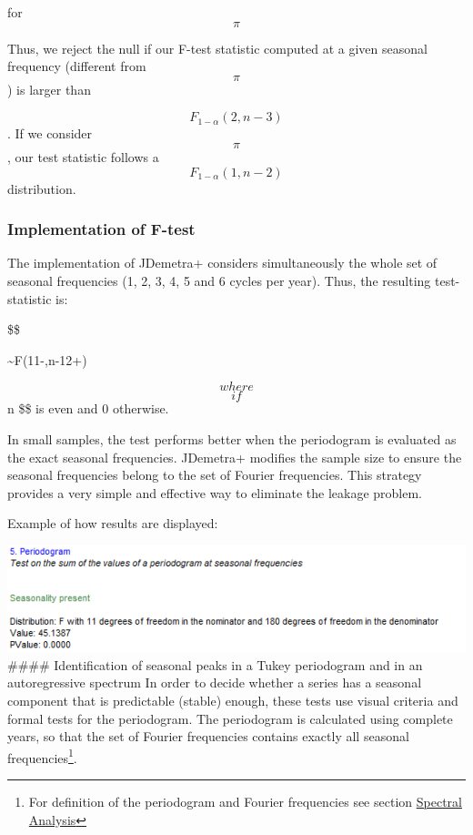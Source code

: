 \documentclass[
  letterpaper,
  DIV=11,
  numbers=noendperiod]{scrreprt}
\begin{document}
for \[ \pi \]

Thus, we reject the null if our F-test statistic computed at a given
seasonal frequency (different from \[ \pi \]) is larger than

\[ F_{1-α}(2,n-3)\]. If we consider \[ \pi  \], our test statistic
follows a \[ F_{1-α}(1,n-2)\] distribution.

\hypertarget{implementation-of-f-test}{%
\subsubsection{Implementation of
F-test}\label{implementation-of-f-test}}

The implementation of JDemetra+ considers simultaneously the whole set
of seasonal frequencies (1, 2, 3, 4, 5 and 6 cycles per year). Thus, the
resulting test-statistic is:

\$\$

 \sim F(11-\delta,n-12+\delta)

\[ where \]  \[ if \] n \$\$ is even and 0 otherwise.

In small samples, the test performs better when the periodogram is
evaluated as the exact seasonal frequencies. JDemetra+ modifies the
sample size to ensure the seasonal frequencies belong to the set of
Fourier frequencies. This strategy provides a very simple and effective
way to eliminate the leakage problem.

Example of how results are displayed:

\includegraphics{./All_images/periodogram.png} \#\#\#\# Identification
of seasonal peaks in a Tukey periodogram and in an autoregressive
spectrum In order to decide whether a series has a seasonal component
that is predictable (stable) enough, these tests use visual criteria and
formal tests for the periodogram. The periodogram is calculated using
complete years, so that the set of Fourier frequencies contains exactly
all seasonal frequencies\footnote{For definition of the periodogram and
  Fourier frequencies see section
  \href{../theory/spectral.html}{Spectral Analysis}}.
\end{document}
